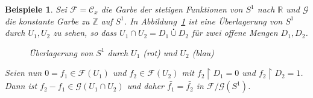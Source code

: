 \documentclass[a4paper,oneside]{scrbook}
\theoremstyle{break}
\newtheorem{Bsp}[Def]{Beispiele}
\theoremstyle{nonumberbreak}
\theoremstyle{nonumberplain}
\theoremstyle{break}
\newcommand{\RR}{%
	\ensuremath{\mathbb{R}}%
}
\newcommand{\ZZ}{%
	\ensuremath{\mathbb{Z}}%
}
\begin{document}
\begin{Bsp}
	Sei $\mathcal{F} = \mathcal{C}_x$ die Garbe der stetigen Funktionen von $S^1$ nach $\RR$ und $\mathcal{G}$ die konstante Garbe zu $\ZZ$ auf $S^1$.
	In Abbildung~\ref{fig:quotient_sheave} ist eine Überlagerung von $S^1$ durch $U_1,U_2$ zu sehen, so dass $U_1 \cap U_2 = D_1 \overset{\centerdot}{\cup} D_2$ für zwei offene Mengen $D_1,D_2$.
	\begin{figure}[h]
		\centering
		\caption{Überlagerung von $S^1$ durch $U_1$ (rot) und $U_2$ (blau)}
		\label{fig:quotient_sheave}
	\end{figure}

	Seien nun $0 = f_1 \in \mathcal{F}(U_1)$ und $f_2 \in \mathcal{F}(U_2)$ mit $f_2 \restriction D_1 = 0$ und $f_2 \restriction D_2 = 1$.
	Dann ist $f_2 - f_1 \in \mathcal{G}( U_1 \cap U_2 )$ und daher $\bar{f_1} = \bar{f_2}$ in $\mathcal{F}\big/\mathcal{G}(S^1)$.
\end{Bsp}
\end{document}
